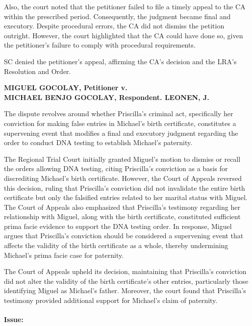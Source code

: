 \documentclass[
12pt,
oneside,
onehalfspacing,
headsepline
]{DigestCollection}
\begin{document}
Also, the court noted that the petitioner failed to file a timely appeal to the CA within the prescribed period. Consequently, the judgment became final and executory. Despite procedural errors, the CA did not dismiss the petition outright. However, the court highlighted that the CA could have done so, given the petitioner's failure to comply with procedural requirements.

SC denied the petitioner's appeal, affirming the CA's decision and the LRA's Resolution and Order. 

\label{fe583390-0a1c-11ef-932c-63c852f65e48}


\noindent\textbf{MIGUEL GOCOLAY, Petitioner  v. \\MICHAEL BENJO GOCOLAY, Respondent. LEONEN, J.}\vspace{0.4cm}

The dispute revolves around whether Priscilla's criminal act, specifically her conviction for making false entries in Michael's birth certificate, constitutes a supervening event that modifies a final and executory judgment regarding the order to conduct DNA testing to establish Michael's paternity. 

The Regional Trial Court initially granted Miguel's motion to dismiss or recall the orders allowing DNA testing, citing Priscilla's conviction as a basis for discrediting Michael's birth certificate. However, the Court of Appeals reversed this decision, ruling that Priscilla's conviction did not invalidate the entire birth certificate but only the falsified entries related to her marital status with Miguel. The Court of Appeals also emphasized that Priscilla's testimony regarding her relationship with Miguel, along with the birth certificate, constituted sufficient prima facie evidence to support the DNA testing order. In response, Miguel argues that Priscilla's conviction should be considered a supervening event that affects the validity of the birth certificate as a whole, thereby undermining Michael's prima facie case for paternity.

The Court of Appeals upheld its decision, maintaining that Priscilla's conviction did not alter the validity of the birth certificate's other entries, particularly those identifying Miguel as Michael's father. Moreover, the court found that Priscilla's testimony provided additional support for Michael's claim of paternity.

\paragraph{Issue:}
\label{05a8d9d0-1245-11ef-aa24-9916ea601717}
\end{document}
